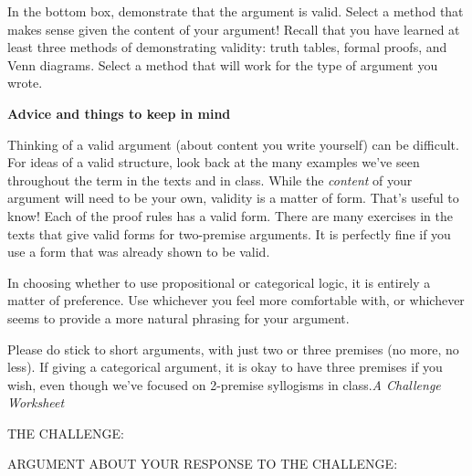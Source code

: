 \documentclass[oneside, openany]{book} %
\begin{document}
\noindent 

\noindent In the bottom box, demonstrate that the argument is valid. Select a method that makes sense given the content of your argument! Recall that you have learned at least three methods of demonstrating validity: truth tables, formal proofs, and Venn diagrams. Select a method that will work for the type of argument you wrote.

\noindent \textbf{Advice and things to keep in mind}

\noindent 

\noindent 

\noindent 

\noindent Thinking of a valid argument (about content you write yourself) can be difficult. For ideas of a valid structure, look back at the many examples we've seen throughout the term in the texts and in class. While the \textit{content }of your argument will need to be your own, validity is a matter of form. That's useful to know! Each of the proof rules has a valid form. There are many exercises in the texts that give valid forms for two-premise arguments. It is perfectly fine if you use a form that was already shown to be valid.

\noindent In choosing whether to use propositional or categorical logic, it is entirely a matter of preference. Use whichever you feel more comfortable with, or whichever seems to provide a more natural phrasing for your argument.

\noindent Please do stick to short arguments, with just two or three premises (no more, no less). If giving a categorical argument, it is okay to have three premises if you wish, even though we've focused on 2-premise syllogisms in class.\textit{A Challenge Worksheet}

\noindent 

\noindent 

\noindent 

\noindent 

\noindent THE CHALLENGE:

\noindent 

\noindent 

\noindent 

\noindent 

\noindent ARGUMENT ABOUT YOUR RESPONSE TO THE CHALLENGE:

\noindent 

\noindent 

\noindent 

\noindent 
\end{document}
